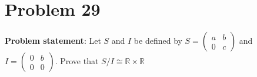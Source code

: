 \documentclass{article} %
\begin{document}
\newpage

\section*{Problem 29}


\textbf{Problem statement}: Let $S$ and $I$ be defined by $S = \left( \begin{matrix} a & b \\ 0 & c \end{matrix} \right)$ and $I = \left( \begin{matrix} 0 & b \\ 0 & 0 \end{matrix} \right)$.  Prove that $S/I \cong \mathbb{R} \times \mathbb{R}$
\\
\end{document}
